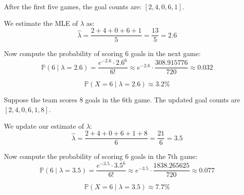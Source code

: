 \documentclass{article}
\begin{document}
\begin{aprob}
            \begin{tcolorbox}[colback=lightgray!10!white, colframe=black, title=A2.b]
                After the first five games, the goal counts are: $[2, 4, 0, 6, 1]$.
                
                We estimate the MLE of $\lambda$ as:
                \[
                \hat{\lambda} = \frac{2 + 4 + 0 + 6 + 1}{5} = \frac{13}{5} = 2.6
                \]
                
                Now compute the probability of scoring 6 goals in the next game:
                \[
                \mathbb{P}(6 \mid \lambda = 2.6) = \frac{e^{-2.6} \cdot 2.6^6}{6!}
                \approx e^{-2.6} \cdot \frac{308.915776}{720} \approx 0.032
                \]
                
                \[
                \boxed{\mathbb{P}(X = 6 \mid \lambda = 2.6) \approx 3.2\%}
                \]
                \end{tcolorbox}
                
                \begin{tcolorbox}[colback=lightgray!10!white, colframe=black, title=A2.c]
                    Suppose the team scores 8 goals in the 6th game. The updated goal counts are $[2, 4, 0, 6, 1, 8]$.
                    
                    We update our estimate of $\lambda$:
                    \[
                    \hat{\lambda} = \frac{2 + 4 + 0 + 6 + 1 + 8}{6} = \frac{21}{6} = 3.5
                    \]
                    
                    Now compute the probability of scoring 6 goals in the 7th game:
                    \[
                    \mathbb{P}(6 \mid \lambda = 3.5) = \frac{e^{-3.5} \cdot 3.5^6}{6!}
                    \approx e^{-3.5} \cdot \frac{1838.265625}{720} \approx 0.077
                    \]
                    
                    \[
                    \boxed{\mathbb{P}(X = 6 \mid \lambda = 3.5) \approx 7.7\%}
                    \]
                    \end{tcolorbox}
                    
\end{aprob}



\newpage
\end{document}
